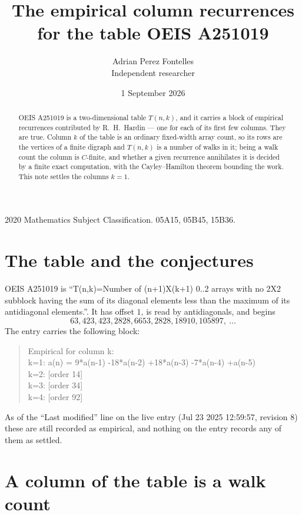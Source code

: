 \documentclass[11pt,a4paper]{article}
\title{The empirical column recurrences for the table OEIS A251019}
\author{Adrian Perez Fontelles\\ \small Independent researcher}
\date{1 September 2026}
\theoremstyle{plain}
\theoremstyle{definition}
\begin{document}
\maketitle

\begin{abstract}
OEIS A251019 is a two-dimensional table $T(n,k)$, and it carries a block of empirical
recurrences contributed by R.~H.~Hardin --- one for each of its first few columns. They are
true. Column $k$ of the table is an ordinary fixed-width array count, so its rows are the
vertices of a finite digraph and $T(n,k)$ is a number of walks in it; being a walk count the
column is $C$-finite, and whether a given recurrence annihilates it is decided by a finite
exact computation, with the Cayley--Hamilton theorem bounding the work. This note settles the columns $k=1$.
\end{abstract}

\noindent\small 2020 Mathematics Subject Classification. 05A15, 05B45, 15B36.\normalsize

\section{The table and the conjectures}

OEIS A251019 is ``T(n,k)=Number of (n+1)X(k+1) 0..2 arrays with no 2X2 subblock having the sum of its diagonal elements less than the maximum of its antidiagonal elements.''. It has offset $1$, is
read by antidiagonals, and begins
\[
63, 423, 423, 2828, 6653, 2828, 18910, 105897,\ \dots
\]
The entry carries the following block:
\begin{quote}\small
Empirical for column k:\\
k=1: a(n) = 9*a(n-1) -18*a(n-2) +18*a(n-3) -7*a(n-4) +a(n-5)\\
k=2: [order 14]\\
k=3: [order 34]\\
k=4: [order 92]\\
\end{quote}
As of the ``Last modified'' line on the live entry (Jul 23 2025 12:59:57, revision 8) these are still
recorded as empirical, and nothing on the entry records any of them as settled.

\section{A column of the table is a walk count}
\end{document}
